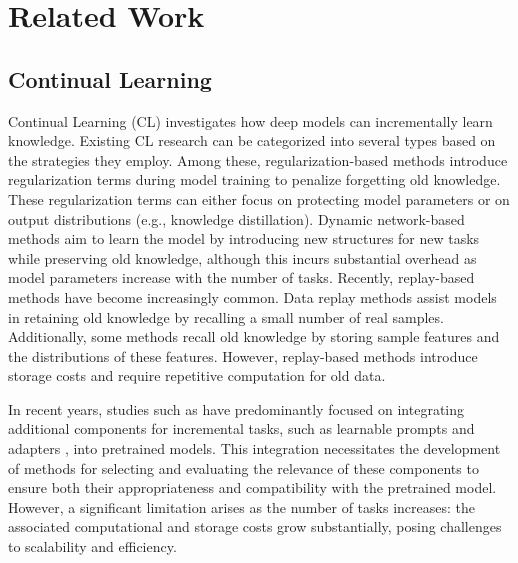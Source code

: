 \section{Related Work}
\label{sec:Related Work}

\subsection{Continual Learning}
\label{sec:Continual Learning}

Continual Learning (CL) investigates how deep models can incrementally learn knowledge. Existing CL research can be categorized into several types based on the strategies they employ. Among these, regularization-based methods \cite{li2017learning, kirkpatrick2017overcoming, douillard2020podnet} introduce regularization terms during model training to penalize forgetting old knowledge. These regularization terms can either focus on protecting model parameters \cite{kirkpatrick2017overcoming} or on output distributions \cite{li2017learning, rebuffi2017icarl} (e.g., knowledge distillation). Dynamic network-based methods \cite{yan2021dynamically, boschini2022class, wang2022foster, zhou2022model} aim to learn the model by introducing new structures for new tasks while preserving old knowledge, although this incurs substantial overhead as model parameters increase with the number of tasks. Recently, replay-based methods have become increasingly common. Data replay methods \cite{wang2022anti, zhou2022model} assist models in retaining old knowledge by recalling a small number of real samples. Additionally, some methods \cite{zhu2021class, zhu2021prototype,petit2023fetril} recall old knowledge by storing sample features and the distributions of these features. However, replay-based methods introduce storage costs and require repetitive computation for old data.

In recent years, studies such as \cite{zhou2024expandable, zhou2023revisiting, wang2022learning, wang2022dualprompt} have predominantly focused on integrating additional components for incremental tasks, such as learnable prompts \cite{wang2022learning, wang2022dualprompt, smith2023coda, gao2024consistent} and adapters \cite{zhou2024expandable, zhou2023revisiting}, into pretrained models. This integration necessitates the development of methods for selecting and evaluating the relevance of these components to ensure both their appropriateness and compatibility with the pretrained model. However, a significant limitation arises as the number of tasks increases: the associated computational and storage costs grow substantially, posing challenges to scalability and efficiency.


